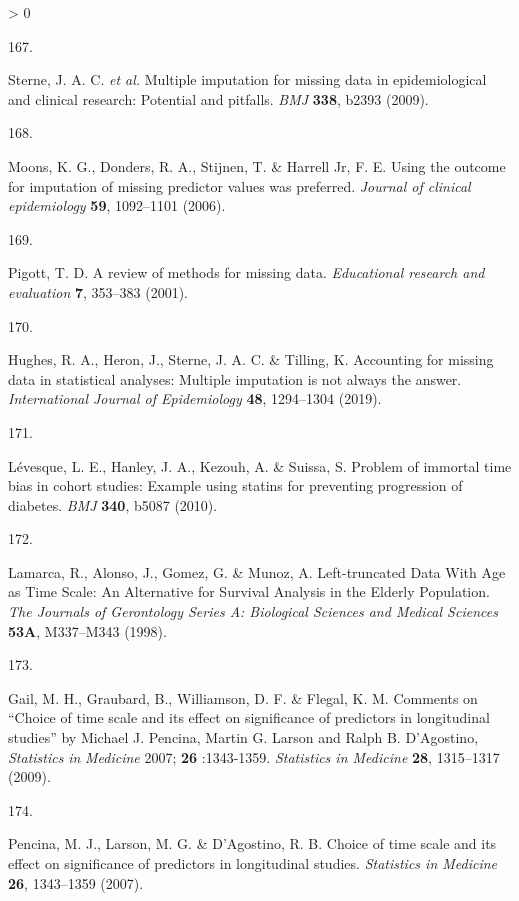 \documentclass[a4paper, twoside]{templates/ociamthesis}
\newlength{\cslhangindent}
\newlength{\csllabelwidth}
\newenvironment{CSLReferences}[3] %
 {%
  \setlength{\parindent}{0pt}
  \ifodd #1 \everypar{\setlength{\hangindent}{\cslhangindent}}\ignorespaces\fi
  \ifnum #2 > 0
  \setlength{\parskip}{#2\baselineskip}
  \fi
 }%
 {}
\newcommand{\CSLLeftMargin}[1]{\parbox[t]{\maxof{\widthof{#1}}{\csllabelwidth}}{#1}}
\newcommand{\CSLRightInline}[1]{\parbox[t]{\linewidth - \csllabelwidth}{#1}}
\begin{document}
\begin{CSLReferences}{0}{0}
\leavevmode\hypertarget{ref-sterne2009}{}%
\CSLLeftMargin{167. }
\CSLRightInline{Sterne, J. A. C. \emph{et al.} Multiple imputation for missing data in epidemiological and clinical research: Potential and pitfalls. \emph{BMJ} \textbf{338}, b2393 (2009).}

\leavevmode\hypertarget{ref-moons2006using}{}%
\CSLLeftMargin{168. }
\CSLRightInline{Moons, K. G., Donders, R. A., Stijnen, T. \& Harrell Jr, F. E. Using the outcome for imputation of missing predictor values was preferred. \emph{Journal of clinical epidemiology} \textbf{59}, 1092--1101 (2006).}

\leavevmode\hypertarget{ref-pigott2001review}{}%
\CSLLeftMargin{169. }
\CSLRightInline{Pigott, T. D. A review of methods for missing data. \emph{Educational research and evaluation} \textbf{7}, 353--383 (2001).}

\leavevmode\hypertarget{ref-hughes2019}{}%
\CSLLeftMargin{170. }
\CSLRightInline{Hughes, R. A., Heron, J., Sterne, J. A. C. \& Tilling, K. Accounting for missing data in statistical analyses: Multiple imputation is not always the answer. \emph{International Journal of Epidemiology} \textbf{48}, 1294--1304 (2019).}

\leavevmode\hypertarget{ref-levesque2010}{}%
\CSLLeftMargin{171. }
\CSLRightInline{Lévesque, L. E., Hanley, J. A., Kezouh, A. \& Suissa, S. Problem of immortal time bias in cohort studies: Example using statins for preventing progression of diabetes. \emph{BMJ} \textbf{340}, b5087 (2010).}

\leavevmode\hypertarget{ref-lamarca1998}{}%
\CSLLeftMargin{172. }
\CSLRightInline{Lamarca, R., Alonso, J., Gomez, G. \& Munoz, A. Left-truncated {Data With Age} as {Time Scale}: {An Alternative} for {Survival Analysis} in the {Elderly Population}. \emph{The Journals of Gerontology Series A: Biological Sciences and Medical Sciences} \textbf{53A}, M337--M343 (1998).}

\leavevmode\hypertarget{ref-gail2009}{}%
\CSLLeftMargin{173. }
\CSLRightInline{Gail, M. H., Graubard, B., Williamson, D. F. \& Flegal, K. M. Comments on {``{Choice} of time scale and its effect on significance of predictors in longitudinal studies''} by {Michael J}. {Pencina}, {Martin G}. {Larson} and {Ralph B}. {D}'{Agostino}, {\emph{Statistics}}{ \emph{in} }{\emph{Medicine}} 2007; {\textbf{26}} :1343-1359. \emph{Statistics in Medicine} \textbf{28}, 1315--1317 (2009).}

\leavevmode\hypertarget{ref-pencina2007}{}%
\CSLLeftMargin{174. }
\CSLRightInline{Pencina, M. J., Larson, M. G. \& D'Agostino, R. B. Choice of time scale and its effect on significance of predictors in longitudinal studies. \emph{Statistics in Medicine} \textbf{26}, 1343--1359 (2007).}


\end{CSLReferences}
\end{document}

